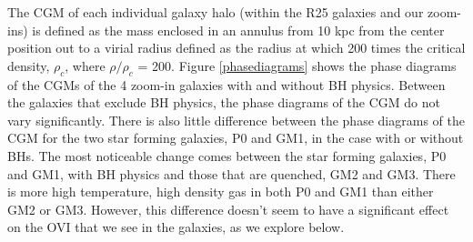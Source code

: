 \documentclass[]{emulateapj}
\begin{document}
The CGM of each individual galaxy halo (within the R25 galaxies and our zoom-ins) is defined as the mass enclosed in an annulus from 10 kpc from the center position out to a virial radius defined as the radius at which 200 times the critical density, $\rho_c$, where $\rho/\rho_c$ = 200. Figure \ref{phasediagrams} shows the phase diagrams of the CGMs of the 4 zoom-in galaxies with and without BH physics. Between the galaxies that exclude BH physics, the phase diagrams of the CGM do not vary significantly. There is also little difference between the phase diagrams of the CGM for the two star forming galaxies, P0 and GM1, in the case with or without BHs. The most noticeable change comes between the star forming galaxies, P0 and GM1, with BH physics and those that are quenched, GM2 and GM3. There is more high temperature, high density gas in both P0 and GM1 than either GM2 or GM3. However, this difference doesn't seem to have a significant effect on the OVI that we see in the galaxies, as we explore below.
\end{document}

